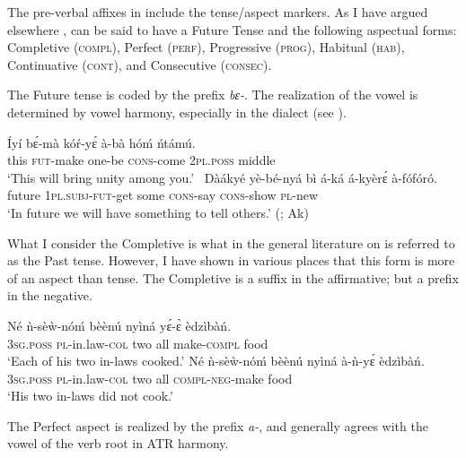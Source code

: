 \documentclass[output=paper]{langsci/langscibook}
\begin{document}
The pre-verbal affixes in  include the tense/aspect markers. As I have argued elsewhere \citep{osam1994a,osam2008b},  can be said to have a Future Tense and the following aspectual forms: Completive (\textsc{compl}), Perfect (\textsc{perf}), Progressive (\textsc{prog}), Habitual (\textsc{hab}), Continuative (\textsc{cont}), and Consecutive (\textsc{consec}).

The Future tense is coded by the prefix \textit{bɛ-}. The realization of the vowel is determined by vowel harmony, especially in the  dialect (see \citealt{dolphyne1988}).

\ea\label{ex:2.osam}
\ea\label{ex:2a.osam}
\gll   \'{I}yí  b\'{ɛ}-mà    kóŕ-y\'{ɛ}    à-bà    hóḿ    ńtámú.\\
      this  \textsc{fut}-make  one-be    \textsc{cons}-come  \textsc{2pl.poss}  middle\\
\glt `This will bring unity among you.' \citep[79]{krampah1970}
\ex\label{ex:2b.osam}
\gll \ Dàákyé yè-bé-nyá    bì  á-ká    á-kyèr\'{ɛ}    à-fófóró.  \\
       future   \textsc{1pl.subj}-\textsc{fut}-get  some  \textsc{cons}-say \textsc{cons}-show  \textsc{pl}-new\\
\glt    `In future we will have something to tell others.' (\citealt[34]{adi1973}; Ak)
\z
\z


What I consider the Completive is what in the general literature on  is referred to as the Past tense. However, I have shown in various places \citep{osam1994a,osam2004,osam2008a} that this form is more of an aspect than tense. The Completive is a suffix in the affirmative; but a prefix in the negative.  

\ea\label{ex:3.osam}
\ea\label{ex:3a.osam}
\gll  Né  ǹ-sèẁ-nóḿ    bèènú   nyìná  yɛ́-ɛ̀ èdzìbàń.\\
     \textsc{3sg}.\textsc{poss} \textsc{pl}-in.law-\textsc{col}  two   all  make-\textsc{compl}  food\\
\glt `Each of his two in-laws cooked.' \citep[57]{krampah1970}
\ex\label{ex:3b.osam}
\gll Né  ǹ-sèẁ-nóḿ    bèènú   nyìná  à-ǹ-yɛ́ èdzìbàń.\\
     \textsc{  3sg}.\textsc{poss} \textsc{pl}-in.law-\textsc{col}  two  all  \textsc{compl-neg}-make  food\\
\glt `His two in-laws did not cook.'
\z 
\z 

The Perfect aspect is realized by the prefix \textit{a-}, and generally agrees with the vowel of the verb root in ATR harmony.
\end{document}
